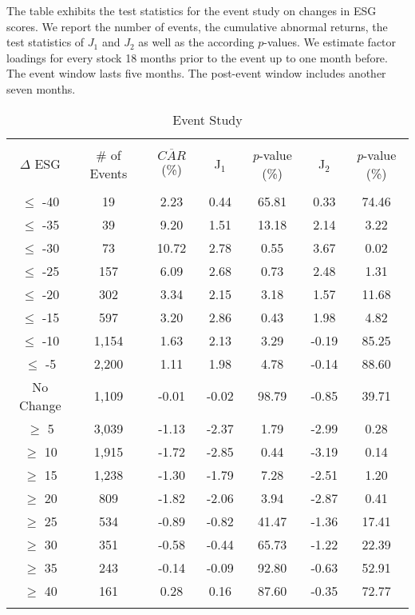 \documentclass[11pt]{article}
\newcommand\fnote[1]{\captionsetup{font=small}\caption*{#1}}
\begin{document}
\begin{table}[!htbp] \centering 
	\caption{Event Study} 
	\fnote{The table exhibits the test statistics for the event study on changes in ESG scores. We report the number of events, the cumulative abnormal returns, the test statistics of $J_1$ and $J_2$ as well as the according $p$-values. We estimate factor loadings for every stock 18 months prior to the event up to one month before. The event window lasts five months. The post-event window includes another seven months.}
	\label{tab:eventstudy} 
	\begin{tabular}{@{\extracolsep{5pt}} ccccccc} 
		\\[-1.8ex]\hline 
		\hline \\[-1.8ex] 
		\multicolumn{1}{c}{$\Delta$ ESG} & \multicolumn{1}{c}{\# of Events} & \multicolumn{1}{c}{$\overline{CAR}$ (\%)} & \multicolumn{1}{c}{J$_1$} & \multicolumn{1}{c}{\textit{p}-value (\%)} & \multicolumn{1}{c}{J$_2$} & \multicolumn{1}{c}{\textit{p}-value (\%)} \\  
		\hline \\[-1.8ex] 
		$\leq$ -40 & 19 & 2.23 & 0.44 & 65.81 & 0.33 & 74.46 \\ 
		$\leq$ -35 & 39 & 9.20 & 1.51 & 13.18 & 2.14 & 3.22 \\ 
		\rowcolor{LightCyan} $\leq$ -30 & 73 & 10.72 & 2.78 & 0.55 & 3.67 & 0.02 \\ 
		\rowcolor{LightCyan} $\leq$ -25 & 157 & 6.09 & 2.68 & 0.73 & 2.48 & 1.31 \\ 
		$\leq$ -20 & 302 & 3.34 & 2.15 & 3.18 & 1.57 & 11.68 \\ 
		\rowcolor{LightCyan} $\leq$ -15  & 597 & 3.20 & 2.86 & 0.43 & 1.98 & 4.82 \\ 
		$\leq$ -10 & 1,154 & 1.63 & 2.13 & 3.29 & -0.19 & 85.25 \\ 
		$\leq$ -5 & 2,200 & 1.11 & 1.98 & 4.78 & -0.14 & 88.60 \\ 
		No Change & 1,109 & -0.01 & -0.02 & 98.79 & -0.85 & 39.71 \\ 
		\rowcolor{LightCyan} $\geq$ 5 & 3,039 & -1.13 & -2.37 & 1.79 & -2.99 & 0.28 \\ 
		\rowcolor{LightCyan} $\geq$ 10 & 1,915 & -1.72 & -2.85 & 0.44 & -3.19 & 0.14 \\ 
		\rowcolor{LightCyan} $\geq$ 15 & 1,238 & -1.30 & -1.79 & 7.28 & -2.51 & 1.20 \\ 
		\rowcolor{LightCyan} $\geq$ 20 & 809 & -1.82 & -2.06 & 3.94 & -2.87 & 0.41 \\ 
		$\geq$ 25 & 534 & -0.89 & -0.82 & 41.47 & -1.36 & 17.41 \\ 
		$\geq$ 30 & 351 & -0.58 & -0.44 & 65.73 & -1.22 & 22.39 \\ 
		$\geq$ 35 & 243 & -0.14 & -0.09 & 92.80 & -0.63 & 52.91 \\ 
		$\geq$ 40 & 161 & 0.28 & 0.16 & 87.60 & -0.35 & 72.77 \\ 
		\hline \\[-1.8ex] 
	\end{tabular} 
\end{table} 
\end{document}
